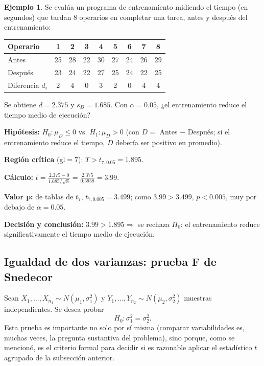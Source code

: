 \documentclass[11pt,a4paper]{article}
\theoremstyle{plain}
\theoremstyle{definition}
\newtheorem{ejemplo}[teorema]{Ejemplo}
\theoremstyle{remark}
\begin{document}
\begin{ejemplo}
Se evalúa un programa de entrenamiento midiendo el tiempo (en segundos) que tardan $8$ operarios en completar una tarea, antes y después del entrenamiento:

\begin{center}
\small
\begin{tabular}{@{}lcccccccc@{}}
\toprule
Operario & 1 & 2 & 3 & 4 & 5 & 6 & 7 & 8 \\
\midrule
Antes & 25 & 28 & 22 & 30 & 27 & 24 & 26 & 29 \\
Después & 23 & 24 & 22 & 27 & 25 & 24 & 22 & 25 \\
Diferencia $d_i$ & 2 & 4 & 0 & 3 & 2 & 0 & 4 & 4 \\
\bottomrule
\end{tabular}
\end{center}

Se obtiene $\overline d=2.375$ y $s_D=1.685$. Con $\alpha=0.05$, ¿el entrenamiento reduce el tiempo medio de ejecución?

\textbf{Hipótesis:} $H_0:\mu_D\le0$ vs. $H_1:\mu_D>0$ (con $D=$ Antes $-$ Después; si el entrenamiento reduce el tiempo, $D$ debería ser positivo en promedio).

\textbf{Región crítica} (gl$=7$): $T>t_{7,0.05}=1.895$.

\textbf{Cálculo:} $\displaystyle t=\frac{2.375-0}{1.685/\sqrt 8}=\frac{2.375}{0.5958}=3.99$.

\textbf{Valor p:} de tablas de $t_7$, $t_{7,0.005}=3.499$; como $3.99>3.499$, $p<0.005$, muy por debajo de $\alpha=0.05$.

\textbf{Decisión y conclusión:} $3.99>1.895\Rightarrow$ se rechaza $H_0$: el entrenamiento reduce significativamente el tiempo medio de ejecución.
\end{ejemplo}

\subsection{Igualdad de dos varianzas: prueba F de Snedecor}

Sean $X_1,\dots,X_{n_1}\sim N(\mu_1,\sigma_1^2)$ y $Y_1,\dots,Y_{n_2}\sim N(\mu_2,\sigma_2^2)$ muestras independientes. Se desea probar
\[
H_0:\sigma_1^2=\sigma_2^2.
\]
Esta prueba es importante no solo por sí misma (comparar variabilidades es, muchas veces, la pregunta sustantiva del problema), sino porque, como se mencionó, es el criterio formal para decidir si es razonable aplicar el estadístico $t$ agrupado de la subsección anterior.
\end{document}
